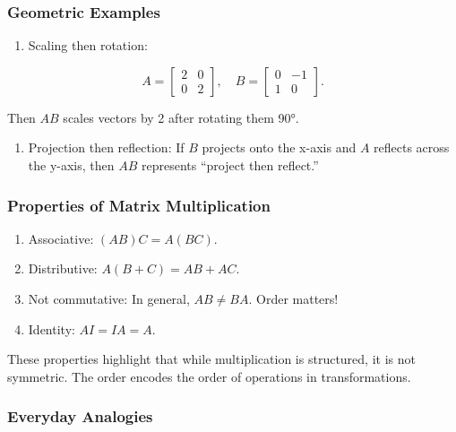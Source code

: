 \documentclass[
  letterpaper,
  DIV=11,
  numbers=noendperiod]{scrreprt}
\providecommand{\tightlist}{%
  \setlength{\itemsep}{0pt}\setlength{\parskip}{0pt}}
\begin{document}
\subsubsection{Geometric Examples}\label{geometric-examples}

\begin{enumerate}
\def\labelenumi{\arabic{enumi}.}
\tightlist
\item
  Scaling then rotation:
\end{enumerate}

\[
A = \begin{bmatrix} 2 & 0 \\ 0 & 2 \end{bmatrix}, \quad 
B = \begin{bmatrix} 0 & -1 \\ 1 & 0 \end{bmatrix}.
\]

Then \(AB\) scales vectors by 2 after rotating them 90°.

\begin{enumerate}
\def\labelenumi{\arabic{enumi}.}
\setcounter{enumi}{1}
\tightlist
\item
  Projection then reflection: If \(B\) projects onto the x-axis and
  \(A\) reflects across the y-axis, then \(AB\) represents ``project
  then reflect.''
\end{enumerate}

\subsubsection{Properties of Matrix
Multiplication}\label{properties-of-matrix-multiplication}

\begin{enumerate}
\def\labelenumi{\arabic{enumi}.}
\tightlist
\item
  Associative: \((AB)C = A(BC)\).
\item
  Distributive: \(A(B + C) = AB + AC\).
\item
  Not commutative: In general, \(AB \neq BA\). Order matters!
\item
  Identity: \(AI = IA = A\).
\end{enumerate}

These properties highlight that while multiplication is structured, it
is not symmetric. The order encodes the order of operations in
transformations.

\subsubsection{Everyday Analogies}\label{everyday-analogies-11}
\end{document}
